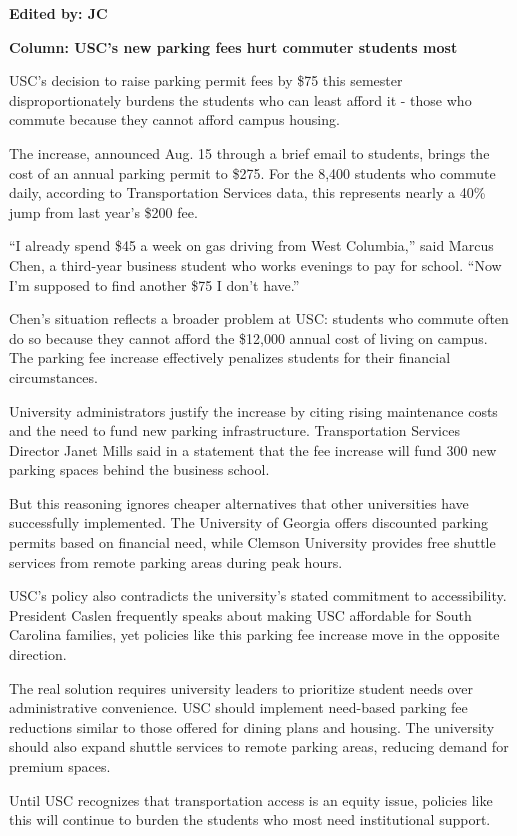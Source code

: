 \documentclass[12pt]{article}
\begin{document}
\newpage
\begin{newversion}
\textbf{Edited by: JC}

\textbf{Column: USC's new parking fees hurt commuter students most}

USC's decision to raise parking permit fees by \$75 this semester disproportionately burdens the students who can least afford it - those who commute because they cannot afford campus housing.

The increase, announced Aug. 15 through a brief email to students, brings the cost of an annual parking permit to \$275. For the 8,400 students who commute daily, according to Transportation Services data, this represents nearly a 40\% jump from last year's \$200 fee.

``I already spend \$45 a week on gas driving from West Columbia,'' said Marcus Chen, a third-year business student who works evenings to pay for school. ``Now I'm supposed to find another \$75 I don't have.''

Chen's situation reflects a broader problem at USC: students who commute often do so because they cannot afford the \$12,000 annual cost of living on campus. The parking fee increase effectively penalizes students for their financial circumstances.

University administrators justify the increase by citing rising maintenance costs and the need to fund new parking infrastructure. Transportation Services Director Janet Mills said in a statement that the fee increase will fund 300 new parking spaces behind the business school.

But this reasoning ignores cheaper alternatives that other universities have successfully implemented. The University of Georgia offers discounted parking permits based on financial need, while Clemson University provides free shuttle services from remote parking areas during peak hours.

USC's policy also contradicts the university's stated commitment to accessibility. President Caslen frequently speaks about making USC affordable for South Carolina families, yet policies like this parking fee increase move in the opposite direction.

The real solution requires university leaders to prioritize student needs over administrative convenience. USC should implement need-based parking fee reductions similar to those offered for dining plans and housing. The university should also expand shuttle services to remote parking areas, reducing demand for premium spaces.

Until USC recognizes that transportation access is an equity issue, policies like this will continue to burden the students who most need institutional support.
\end{newversion}
\end{document}
